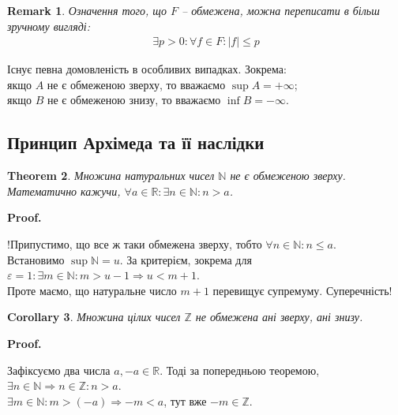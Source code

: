 \documentclass[a4paper, 14pt]{article}
\makeatletter
\def\qed{$\blacksquare$}
\theoremstyle{theoremdd}
\newtheorem{theorem}{Theorem}[subsection]
\theoremstyle{theoremdd}
\theoremstyle{theoremdd}
\theoremstyle{theoremdd}
\theoremstyle{theoremdd}
\theoremstyle{theoremdd}
\newtheorem{remark}[theorem]{Remark}
\theoremstyle{theoremdd}
\theoremstyle{theoremdd}
\newtheorem{corollary}[theorem]{Corollary}
\renewenvironment{proof}[1][Proof.\\]{\par
\pushQED{\hfill \qed}%
\normalfont \topsep6\p@\@plus6\p@\relax
\trivlist
\item\relax
{\bfseries
#1\@addpunct{.}}\hspace\labelsep\ignorespaces
}{%
\popQED\endtrivlist\@endpefalse
}
\makeatother
\begin{document}
	\begin{remark}
	Означення того, що $F$ -- обмежена, можна переписати в більш зручному вигляді:
	\begin{align*}
	\exists p>0: \forall f \in F: |f| \leq p
	\end{align*}
	\end{remark}
	
	Існує певна домовленість в особливих випадках. Зокрема:\\
	якщо $A$ не є обмеженою зверху, то вважаємо $\sup A = +\infty$;\\
	якщо $B$ не є обмеженою знизу, то вважаємо $\inf B = -\infty$.\\
	
	\subsection{Принцип Архімеда та її наслідки}
	\begin{theorem}
	Множина натуральних чисел $\mathbb{N}$ не є обмеженою зверху.\\
	Математично кажучи, $\forall a \in \mathbb{R}: \exists n \in \mathbb{N}: n > a$.
	\end{theorem}
	
	\begin{proof}
	!Припустимо, що все ж таки обмежена зверху, тобто $\forall n \in \mathbb{N}: n \leq a$.\\
	Встановимо $\displaystyle\sup \mathbb{N} = u$. За критерієм, зокрема для $\varepsilon = 1: \exists m \in \mathbb{N}: m > u-1 \Rightarrow u < m+1$.\\
	Проте маємо, що натуральне число $m+1$ перевищує супремуму. Суперечність!
	\end{proof}
	
	\begin{corollary}
	Множина цілих чисел $\mathbb{Z}$ не обмежена ані зверху, ані знизу.
	\end{corollary}
	
	\begin{proof}
	Зафіксуємо два числа $a,-a \in \mathbb{R}$. Тоді за попередньою теоремою,\\
	$\exists n \in \mathbb{N} \Rightarrow n \in \mathbb{Z}: n > a$.\\
	$\exists m \in \mathbb{N}: m > (-a) \Rightarrow -m < a$, тут вже $-m \in \mathbb{Z}$.
	\end{proof}
	
\end{document}
